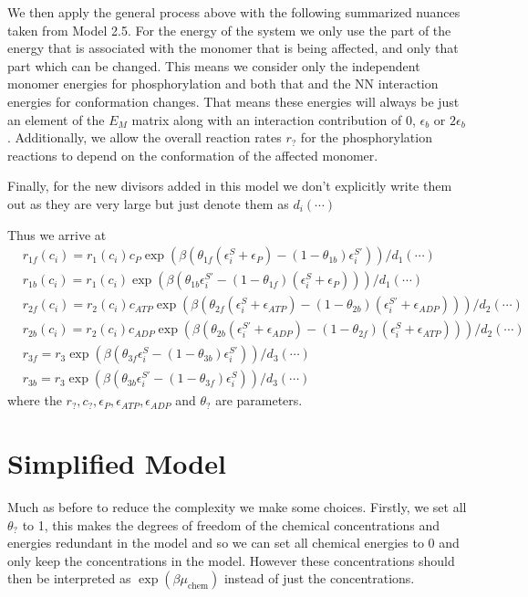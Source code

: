 \documentclass[11pt]{article}
\begin{document}
\begin{tcolorbox}
	We then apply the general process above with the following summarized nuances taken from Model 2.5.
	For the energy of the system we only use the part of the energy that is associated with the monomer that is being affected, and only that part which can be changed.
	This means we consider only the independent monomer energies for phosphorylation and both that and the NN interaction energies for conformation changes.
	That means these energies will always be just an element of the $E_M$ matrix along with an interaction contribution of 0, $\epsilon_b$ or $2\epsilon_b$.
	Additionally, we allow the overall reaction rates $r_?$ for the phosphorylation reactions to depend on the conformation of the affected monomer.

	Finally, for the new divisors added in this model we don't explicitly write them out as they are very large but just denote them as $d_i(\cdots)$

	Thus we arrive at
	\begin{align}
		 & r_{1f}(c_i) = r_1(c_i)c_P\exp(\beta(\theta_{1f}(\epsilon_i^S+\epsilon_P)-(1-\theta_{1b})\epsilon_i^{S'})) / d_1(\cdots) \label{eq:rate1f}                          \\
		 & r_{1b}(c_i) = r_1(c_i)\exp(\beta(\theta_{1b}\epsilon_i^{S'}-(1-\theta_{1f})(\epsilon_i^S+\epsilon_P))) / d_1(\cdots) \label{eq:rate1b}                             \\
		 & r_{2f}(c_i) = r_2(c_i)c_{ATP}\exp(\beta(\theta_{2f}(\epsilon_i^S+\epsilon_{ATP})-(1-\theta_{2b})(\epsilon_i^{S'}+\epsilon_{ADP}))) / d_2(\cdots) \label{eq:rate2f} \\
		 & r_{2b}(c_i) = r_2(c_i)c_{ADP}\exp(\beta(\theta_{2b}(\epsilon_i^{S'}+\epsilon_{ADP})-(1-\theta_{2f})(\epsilon_i^S+\epsilon_{ATP}))) / d_2(\cdots) \label{eq:rate2b} \\
		 & r_{3f} = r_3\exp(\beta(\theta_{3f}\epsilon_i^S-(1-\theta_{3b})\epsilon_i^{S'})) / d_3(\cdots) \label{eq:rate3f}                                                    \\
		 & r_{3b} = r_3\exp(\beta(\theta_{3b}\epsilon_i^{S'}-(1-\theta_{3f})\epsilon_i^S)) / d_3(\cdots) \label{eq:rate3b}
	\end{align}
	where the $r_?,c_?,\epsilon_P,\epsilon_{ATP},\epsilon_{ADP}$ and $\theta_?$ are parameters.
\end{tcolorbox}

\section{Simplified Model}
Much as before to reduce the complexity we make some choices.
Firstly, we set all $\theta_?$ to 1, this makes the degrees of freedom of the chemical concentrations and energies redundant in the model and so we can set all chemical energies to 0 and only keep the concentrations in the model.
However these concentrations should then be interpreted as $\exp(\beta \mu_\text{chem})$ instead of just the concentrations.
\end{document}
